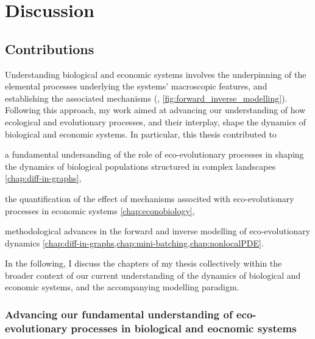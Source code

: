 
\graphicspath{{./content/conclusion/fig/}}

\chapter{Discussion}
\label{sec:conclusion}



\section{Contributions}
Understanding biological and economic systems involves the underpinning of the elemental processes underlying the systems' macroscopic features, and establishing the associated mechanisms (\cite{Levin2002}, \cref{fig:forward_inverse_modelling}).
% 
Following this approach, my work aimed at advancing our understanding of how ecological and evolutionary processes, and their interplay, shape the dynamics of biological and economic systems. In particular, this thesis contributed to 
% 
\begin{mylisti}
    \item a fundamental undersanding of the role of eco-evolutionary processes in shaping the dynamics of biological populations structured in complex landscapes \cref{chap:diff-in-graphs},
    \item the quantification of the effect of mechanisms associted with eco-evolutionary processes in economic systems \cref{chap:econobiology},
    \item methodological advances in the forward and inverse modelling of eco-evolutionary dynamics \cref{chap:diff-in-graphs,chap:mini-batching,chap:nonlocalPDE}.
\end{mylisti}

In the following, I discuss the chapters of my thesis collectively within the broader context of our current understanding of the dynamics of biological and economic systems, and the accompanying modelling paradigm.

\subsection{Advancing our fundamental understanding of eco-evolutionary processes in biological and eocnomic systems}

